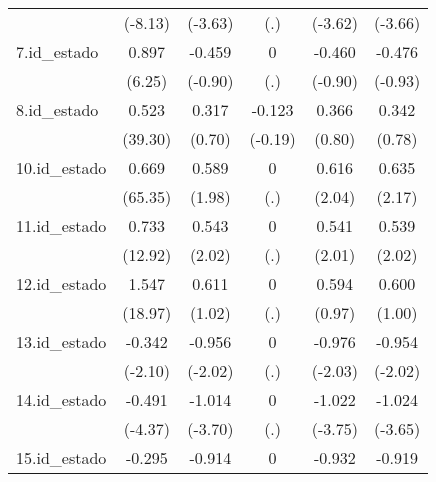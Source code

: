 {\begin{tabular}{l*{5}{c}}
            &     (-8.13)         &     (-3.63)         &         (.)         &     (-3.62)         &     (-3.66)         \\
[1em]
7.id\_estado &       0.897\sym{***}&      -0.459         &           0         &      -0.460         &      -0.476         \\
            &      (6.25)         &     (-0.90)         &         (.)         &     (-0.90)         &     (-0.93)         \\
[1em]
8.id\_estado &       0.523\sym{***}&       0.317         &      -0.123         &       0.366         &       0.342         \\
            &     (39.30)         &      (0.70)         &     (-0.19)         &      (0.80)         &      (0.78)         \\
[1em]
10.id\_estado&       0.669\sym{***}&       0.589\sym{*}  &           0         &       0.616\sym{*}  &       0.635\sym{*}  \\
            &     (65.35)         &      (1.98)         &         (.)         &      (2.04)         &      (2.17)         \\
[1em]
11.id\_estado&       0.733\sym{***}&       0.543\sym{*}  &           0         &       0.541\sym{*}  &       0.539\sym{*}  \\
            &     (12.92)         &      (2.02)         &         (.)         &      (2.01)         &      (2.02)         \\
[1em]
12.id\_estado&       1.547\sym{***}&       0.611         &           0         &       0.594         &       0.600         \\
            &     (18.97)         &      (1.02)         &         (.)         &      (0.97)         &      (1.00)         \\
[1em]
13.id\_estado&      -0.342\sym{*}  &      -0.956\sym{*}  &           0         &      -0.976\sym{*}  &      -0.954\sym{*}  \\
            &     (-2.10)         &     (-2.02)         &         (.)         &     (-2.03)         &     (-2.02)         \\
[1em]
14.id\_estado&      -0.491\sym{***}&      -1.014\sym{***}&           0         &      -1.022\sym{***}&      -1.024\sym{***}\\
            &     (-4.37)         &     (-3.70)         &         (.)         &     (-3.75)         &     (-3.65)         \\
[1em]
15.id\_estado&      -0.295\sym{***}&      -0.914\sym{*}  &           0         &      -0.932\sym{*}  &      -0.919\sym{*}  \\

\end{tabular}}
